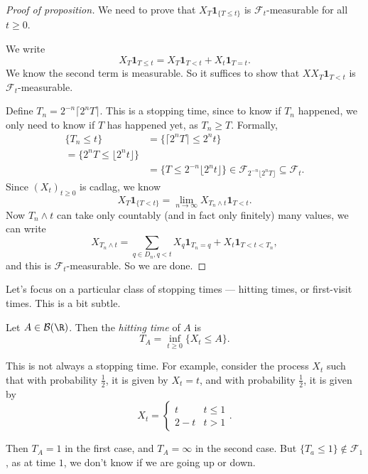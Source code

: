 \documentclass[a4paper]{article}
\begin{document}
\begin{proof}[Proof of proposition]
  We need to prove that $X_T \mathbf{1}_{\{T \leq t\}}$ is $\mathcal{F}_t$-measurable for all $t \geq 0$.

  We write
  \[
    X_T\mathbf{1}_{T \leq t} = X_T \mathbf{1}_{T < t} + X_t \mathbf{1}_{T = t}.
  \]
  We know the second term is measurable. So it suffices to show that $XX_T \mathbf{1}_{T < t}$ is $\mathcal{F}_t$-measurable.

  Define $T_n = 2^{-n} \lceil 2^n T\rceil$. This is a stopping time, since to know if $T_n$ happened, we only need to know if $T$ has happened yet, as $T_n \geq T$. Formally,
  \begin{align*}
    \{T_n \leq t\} &= \{\lceil 2^n T \rceil \leq 2^n t\} \\
    = \{2^n T \leq \lfloor 2^n t\rfloor\} \\
    &= \{T \leq 2^{-n} \lfloor 2^n t \rfloor\} \in \mathcal{F}_{2^{-n}\lfloor 2^n T\rfloor} \subseteq \mathcal{F}_t.
  \end{align*}
  Since $(X_t)_{t \geq 0}$ is cadlag, we know
  \[
    X_T \mathbf{1}_{\{T < t\}} = \lim_{n \to \infty} X_{T_n \wedge t} \mathbf{1}_{T < t}.
  \]
  Now $T_n \wedge t$ can take only countably (and in fact only finitely) many values, we can write
  \[
    X_{T_n \wedge t} = \sum_{q \in D_n, q < t} X_{q} \mathbf{1}_{T_n = q} + X_t \mathbf{1}_{T < t < T_n},
  \]
  and this is $\mathcal{F}_t$-measurable. So we are done.
\end{proof}

Let's focus on a particular class of stopping times --- hitting times, or first-visit times. This is a bit subtle.

\begin{defi}
  Let $A \in \mathcal{B}(\R)$. Then the \emph{hitting time} of $A$ is
  \[
    T_A = \inf_{t \geq 0} \{X_t \leq A\}.
  \]
\end{defi}

This is not always a stopping time. For example, consider the process $X_t$ such that with probability $\frac{1}{2}$, it is given by $X_t = t$, and with probability $\frac{1}{2}$, it is given by
\[
  X_t =
  \begin{cases}
    t & t \leq 1\\
    2 - t & t > 1
  \end{cases}.
\]
\begin{center}
\end{center}
Then $T_A = 1$ in the first case, and $T_A = \infty$ in the second case. But $\{T_a \leq 1\} \not \in \mathcal{F}_1$, as at time $1$, we don't know if we are going up or down.
\end{document}

